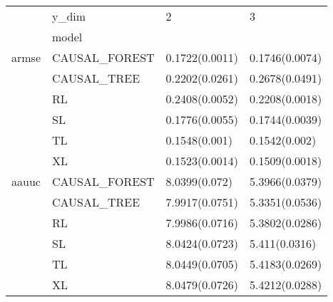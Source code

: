 \begin{tabular}{llll}
\toprule
      & y\_dim &               2 &               3 \\
{} & model &                 &                 \\
\midrule
armse & CAUSAL\_FOREST &  0.1722(0.0011) &  0.1746(0.0074) \\
      & CAUSAL\_TREE &  0.2202(0.0261) &  0.2678(0.0491) \\
      & RL &  0.2408(0.0052) &  0.2208(0.0018) \\
      & SL &  0.1776(0.0055) &  0.1744(0.0039) \\
      & TL &   0.1548(0.001) &   0.1542(0.002) \\
      & XL &  0.1523(0.0014) &  0.1509(0.0018) \\
aauuc & CAUSAL\_FOREST &   8.0399(0.072) &  5.3966(0.0379) \\
      & CAUSAL\_TREE &  7.9917(0.0751) &  5.3351(0.0536) \\
      & RL &  7.9986(0.0716) &  5.3802(0.0286) \\
      & SL &  8.0424(0.0723) &   5.411(0.0316) \\
      & TL &  8.0449(0.0705) &  5.4183(0.0269) \\
      & XL &  8.0479(0.0726) &  5.4212(0.0288) \\
\bottomrule
\end{tabular}
